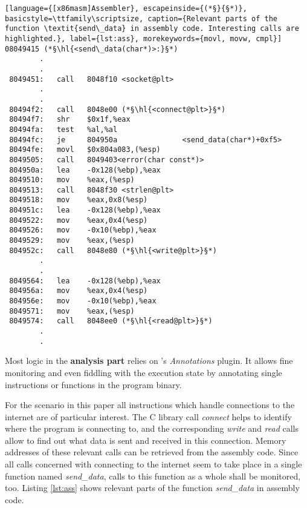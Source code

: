 \bigskip
\begin{lstlisting}[language={[x86masm]Assembler}, escapeinside={(*§}{§*)}, basicstyle=\ttfamily\scriptsize, caption={Relevant parts of the function \textit{send\_data} in assembly code. Interesting calls are highlighted.}, label={lst:ass}, morekeywords={movl, movw, cmpl}]
08049415 (*§\hl{<send\_data(char*)>:}§*)
		.
		.
 8049451:   call   8048f10 <socket@plt>
		.
		.
 80494f2:   call   8048e00 (*§\hl{<connect@plt>}§*)
 80494f7:   shr    $0x1f,%eax
 80494fa:   test   %al,%al
 80494fc:   je     804950a				 <send_data(char*)+0xf5>
 80494fe:   movl   $0x804a083,(%esp)
 8049505:   call   8049403<error(char const*)>
 804950a:   lea    -0x128(%ebp),%eax
 8049510:   mov    %eax,(%esp)
 8049513:   call   8048f30 <strlen@plt>
 8049518:   mov    %eax,0x8(%esp)
 804951c:   lea    -0x128(%ebp),%eax
 8049522:   mov    %eax,0x4(%esp)
 8049526:   mov    -0x10(%ebp),%eax
 8049529:   mov    %eax,(%esp)
 804952c:   call   8048e80 (*§\hl{<write@plt>}§*)
 	 	.
 	 	.
 8049564:   lea    -0x128(%ebp),%eax
 804956a:   mov    %eax,0x4(%esp)
 804956e:   mov    -0x10(%ebp),%eax
 8049571:   mov    %eax,(%esp)
 8049574:   call   8048ee0 (*§\hl{<read@plt>}§*)
		.
		.
\end{lstlisting}
\bigskip

Most logic in the \textbf{analysis part} relies on \sse's \textit{Annotations} plugin.
It allows fine monitoring and even fiddling with the execution state by annotating single instructions or functions in the program binary.

For the scenario in this paper all instructions which handle connections to the internet are of particular interest.
The C library call \textit{connect} helps to identify where the program is connecting to, and the corresponding \textit{write} and \textit{read} calls allow to find out what data is sent and received in this connection.
Memory addresses of these relevant calls can be retrieved from the assembly code.
Since all calls concerned with connecting to the internet seem to take place in a single function named \textit{send\_data}, calls to this function as a whole shall be monitored, too.
Listing \ref{lst:ass} shows relevant parts of the function \textit{send\_data} in assembly code.


